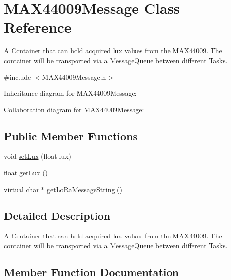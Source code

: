 \hypertarget{class_m_a_x44009_message}{}\section{M\+A\+X44009\+Message Class Reference}
\label{class_m_a_x44009_message}


A Container that can hold acquired lux values from the \hyperlink{class_m_a_x44009}{M\+A\+X44009}. The container will be transported via a Message\+Queue between different Tasks.  




{\ttfamily \#include $<$M\+A\+X44009\+Message.\+h$>$}



Inheritance diagram for M\+A\+X44009\+Message\+:


Collaboration diagram for M\+A\+X44009\+Message\+:
\subsection*{Public Member Functions}
\begin{DoxyCompactItemize}
\item 
void \hyperlink{class_m_a_x44009_message_aabe00c4d74cce7093c7830394e708228}{set\+Lux} (float lux)
\item 
float \hyperlink{class_m_a_x44009_message_a68ba69dab7503e2643d13a2f856523f7}{get\+Lux} ()
\item 
virtual char $\ast$ \hyperlink{class_m_a_x44009_message_ab34f5b992a01dd21f567c31b1af75b61}{get\+Lo\+Ra\+Message\+String} ()
\end{DoxyCompactItemize}


\subsection{Detailed Description}
A Container that can hold acquired lux values from the \hyperlink{class_m_a_x44009}{M\+A\+X44009}. The container will be transported via a Message\+Queue between different Tasks. 

\subsection{Member Function Documentation}
\hypertarget{class_m_a_x44009_message_ab34f5b992a01dd21f567c31b1af75b61}{}
